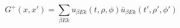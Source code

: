 \begin{equation}
G^+(x,x')= \sum_{\beta E k} u_{\beta E k}(t,\rho,\phi) \bar{u}_{\beta E
k}(t',\rho',\phi')
\end{equation} 
